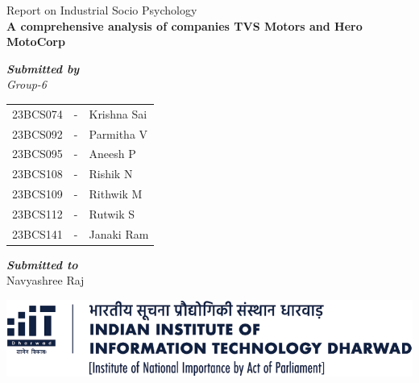 \begin{titlepage}
\begin{singlespace}
\begin{center}
	{\LARGE Report on Industrial Socio Psychology}
	\\[2cm]
	{\Huge \textbf{A comprehensive analysis of companies TVS Motors and Hero MotoCorp}}\\[2.3cm]
	{\Large 
	\textbf{\textit{Submitted by}}\\[0.75cm]
	\textit{Group-6}\\[0.4cm]
	
	\begin{tabular}{ccl}
		23BCS074 & - & Krishna Sai \\
		23BCS092 & - & Parmitha V \\
		23BCS095 & - & Aneesh P \\
		23BCS108 & - & Rishik N \\
		23BCS109 & - & Rithwik M \\
		23BCS112 & - & Rutwik S \\
		23BCS141 & - & Janaki Ram \\[1.5cm]
	\end{tabular}


	\textbf{\textit{Submitted to}}\\[0.75cm]
	Navyashree Raj}
	
	\vfill
	\includegraphics[width=0.8\linewidth]{psycho_images/logo-full-light.png}
	
\end{center}
\end{singlespace}	
\end{titlepage}